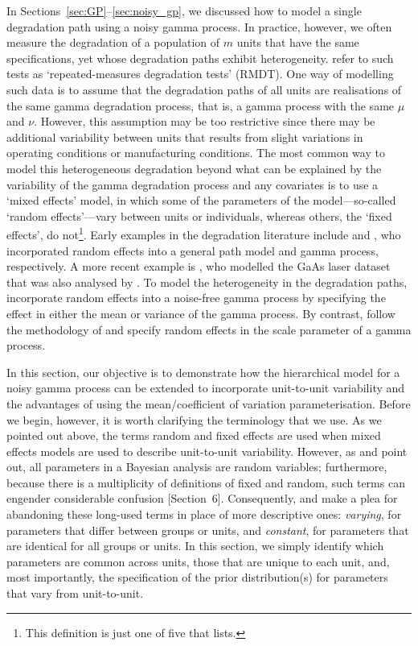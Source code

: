 \documentclass{article}
\begin{document}
In Sections~\ref{sec:GP}--\ref{sec:noisy_gp}, we discussed how to model a single degradation path using a noisy gamma process. In practice, however, we often measure the degradation of a population of $m$ units that have the same specifications, yet whose degradation paths exhibit heterogeneity. \citet{Meeker_2022} refer to such tests as `repeated-measures degradation tests' (RMDT). One way of modelling such data is to assume that the degradation paths of all units are realisations of the same gamma degradation process, that is, a gamma process with the same $\mu$ and $\nu$. However, this assumption may be too restrictive since there may be additional variability between units that results from slight variations in operating conditions or manufacturing conditions. The most common way to model this heterogeneous degradation beyond what can be explained by the variability of the gamma degradation process and any covariates is to use a `mixed effects' model, in which some of the parameters of the model---so-called `random effects'---vary between units or individuals, whereas others, the `fixed effects', do not\footnote{This definition is just one of five that \citet{Gelman2005} lists.}. Early examples in the degradation literature include \citet{lu_meeker_1993}and \citet{lawless_covariates_2004}, who incorporated random effects into a general path model and gamma process, respectively. A more recent example is \citet{rodriguez-picon_degradation_2018}, who modelled the GaAs laser dataset that was also analysed by \citet{Meeker_1998}. To model the heterogeneity in the degradation paths, \citet{rodriguez-picon_degradation_2018} incorporate random effects into a noise-free gamma process by specifying the effect in either the mean or variance of the gamma process. By contrast, \citet{peng_2018} follow the methodology of \citet{lawless_covariates_2004} and specify random effects in the scale parameter of a gamma process.

In this section, our objective is to demonstrate how the hierarchical model for a noisy gamma process can be extended to incorporate unit-to-unit variability and the advantages of using the mean/coefficient of variation parameterisation. Before we begin, however, it is worth clarifying the terminology that we use. As we pointed out above, the terms random and fixed effects are used when mixed effects models are used to describe unit-to-unit variability. However, as \citet{Gelman2005} and \citet{gelman_hill_2006} point out, all parameters in a Bayesian analysis are random variables; furthermore, because there is a multiplicity of definitions of fixed and random, such terms can engender considerable confusion [Section~6]\citep{Gelman2005}. Consequently, \citet{Gelman2005} and \citet{gelman_hill_2006} make a plea for abandoning these long-used terms in place of more descriptive ones: \emph{varying}, for parameters that differ between groups or units, and \emph{constant}, for parameters that are identical for all groups or units. In this section, we simply identify which parameters are common across units, those that are unique to each unit, and, most importantly, the specification of the prior distribution(s) for parameters that vary from unit-to-unit.
\end{document}
